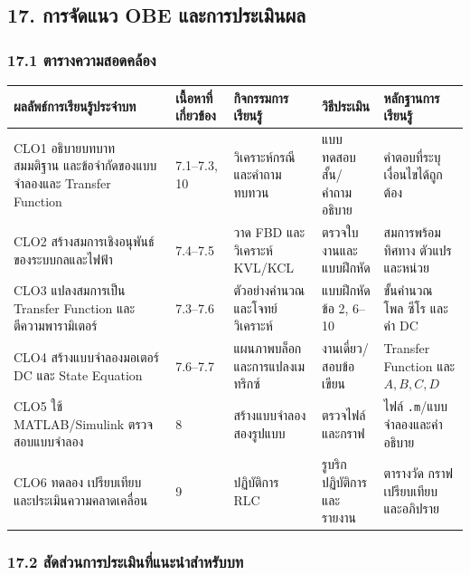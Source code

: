 
\subsection{17. การจัดแนว OBE และการประเมินผล}

\subsubsection{17.1 ตารางความสอดคล้อง}

\begin{table}[htbp]
    \centering
    \begin{tabular}{l l l l l}
        \hline
        \textbf{ผลลัพธ์การเรียนรู้ประจำบท} & \textbf{เนื้อหาที่เกี่ยวข้อง} & \textbf{กิจกรรมการเรียนรู้} & \textbf{วิธีประเมิน} & \textbf{หลักฐานการเรียนรู้} \\
        \hline
        CLO1 อธิบายบทบาท สมมติฐาน และข้อจำกัดของแบบจำลองและ Transfer Function & 7.1–7.3, 10 & วิเคราะห์กรณีและคำถามทบทวน & แบบทดสอบสั้น/คำถามอธิบาย & คำตอบที่ระบุเงื่อนไขได้ถูกต้อง \\
        CLO2 สร้างสมการเชิงอนุพันธ์ของระบบกลและไฟฟ้า & 7.4–7.5 & วาด FBD และวิเคราะห์ KVL/KCL & ตรวจใบงานและแบบฝึกหัด & สมการพร้อมทิศทาง ตัวแปร และหน่วย \\
        CLO3 แปลงสมการเป็น Transfer Function และตีความพารามิเตอร์ & 7.3–7.6 & ตัวอย่างคำนวณและโจทย์วิเคราะห์ & แบบฝึกหัดข้อ 2, 6–10 & ขั้นคำนวณ โพล ซีโร และค่า DC \\
        CLO4 สร้างแบบจำลองมอเตอร์ DC และ State Equation & 7.6–7.7 & แผนภาพบล็อกและการแปลงเมทริกซ์ & งานเดี่ยว/สอบข้อเขียน & Transfer Function และ $A,B,C,D$ \\
        CLO5 ใช้ MATLAB/Simulink ตรวจสอบแบบจำลอง & 8 & สร้างแบบจำลองสองรูปแบบ & ตรวจไฟล์และกราฟ & ไฟล์ \texttt{.m}/แบบจำลองและคำอธิบาย \\
        CLO6 ทดลอง เปรียบเทียบ และประเมินความคลาดเคลื่อน & 9 & ปฏิบัติการ RLC & รูบริกปฏิบัติการและรายงาน & ตารางวัด กราฟเปรียบเทียบ และอภิปราย \\
        \hline
    \end{tabular}
\end{table}

\subsubsection{17.2 สัดส่วนการประเมินที่แนะนำสำหรับบท}

